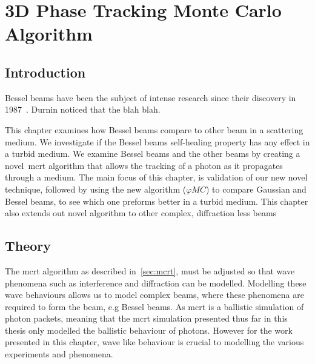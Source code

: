 \chapter{3D Phase Tracking Monte Carlo Algorithm}\label{sec:phase}

\section{Introduction}\label{sec:besintro}


Bessel beams have been the subject of intense research since their discovery in 1987~\cite{durnin1987diffraction,durnin1987exact}. Durnin noticed that the blah blah.

This chapter examines how Bessel beams compare to other beam in a scattering medium. 
We investigate if the Bessel beams self-healing property has any effect in a turbid medium.
We examine Bessel beams and the other beams by creating a novel~\gls*{mcrt} algorithm that allows the tracking of a photon as it propagates through a medium. 
The main focus of this chapter, is validation of our new novel technique, followed by using the new algorithm ($\varphi MC$) to compare Gaussian and Bessel beams, to see which one preforms better in a turbid medium. 
This chapter also extends out novel algorithm to other complex, diffraction less beams




\section{Theory}\label{sec:bestheory}

The \gls*{mcrt} algorithm as described in~\cref{sec:mcrt}, must be adjusted so that wave phenomena such as interference and diffraction can be modelled. 
Modelling these wave behaviours allows us to model complex beams, where these phenomena are required to form the beam, e.g Bessel beams. 
As \gls*{mcrt} is a ballistic simulation of photon packets, meaning that the \gls*{mcrt} simulation presented thus far in this thesis only modelled the ballistic behaviour of photons. 
However for the work presented in this chapter, wave like behaviour is crucial to modelling the various experiments and phenomena.

